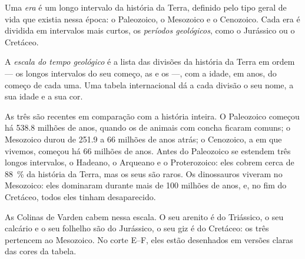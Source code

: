 \begin{definition}\label{def:g7:geological-time:era-period}
Uma \emph{era} é um longo intervalo da história da Terra,
definido pelo tipo geral de vida que existia nessa época: o Paleozoico, o
Mesozoico e o Cenozoico. Cada era é dividida em intervalos mais curtos,
os \emph{períodos geológicos}, como o
Jurássico ou o Cretáceo.
\end{definition}

\begin{definition}\label{def:g7:geological-time:time-scale}
A \emph{escala do tempo geológico} é a lista
das divisões da história da Terra em ordem --- os longos intervalos do
seu começo, as  e os  ---, com a idade, em anos,
do começo de cada uma. Uma tabela internacional dá a cada divisão o seu
nome, a sua idade e a sua cor.
\end{definition}


As três  são recentes em comparação com a história inteira. O
Paleozoico começou há \num{538.8} milhões de anos, quando os  de
animais com concha ficaram comuns; o Mesozoico durou de \num{251.9} a
\num{66} milhões de anos atrás; o Cenozoico, a  em que vivemos,
começou há \num{66} milhões de anos. Antes do Paleozoico se estendem três
longos intervalos, o Hadeano, o Arqueano e o Proterozoico: eles cobrem
cerca de 88~\% da história da Terra, mas os seus  são raros. Os dinossauros viveram no Mesozoico: eles dominaram
durante mais de \num{100} milhões de anos, e, no fim do Cretáceo, todos
eles tinham desaparecido.

As Colinas de Varden cabem nessa escala. O seu arenito é do Triássico, o
seu calcário e o seu folhelho são do Jurássico, o seu giz é do Cretáceo:
os três pertencem ao Mesozoico. No corte E--F, eles estão desenhados em
versões claras das cores da tabela.

